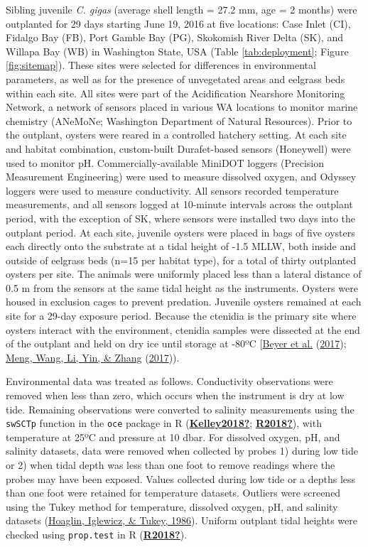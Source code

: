\documentclass [11pt, proquest] {uwthesis}[2015/03/03]
\begin{document}
Sibling juvenile \emph{C. gigas} (average shell length = 27.2 mm, age = 2 months) were outplanted for 29 days starting June 19, 2016 at five locations: Case Inlet (CI), Fidalgo Bay (FB), Port Gamble Bay (PG), Skokomish River Delta (SK), and Willapa Bay (WB) in Washington State, USA (Table \ref{tab:deployment}; Figure \ref{fig:sitemap}). These sites were selected for differences in environmental parameters, as well as for the presence of unvegetated areas and eelgrass beds within each site. All sites were part of the Acidification Nearshore Monitoring Network, a network of sensors placed in various WA locations to monitor marine chemistry (ANeMoNe; Washington Department of Natural Resources). Prior to the outplant, oysters were reared in a controlled hatchery setting. At each site and habitat combination, custom-built Durafet-based sensors (Honeywell) were used to monitor pH. Commercially-available MiniDOT loggers (Precision Measurement Engineering) were used to measure dissolved oxygen, and Odyssey loggers were used to measure conductivity. All sensors recorded temperature measurements, and all sensors logged at 10-minute intervals across the outplant period, with the exception of SK, where sensors were installed two days into the outplant period. At each site, juvenile oysters were placed in bags of five oysters each directly onto the substrate at a tidal height of -1.5 MLLW, both inside and outside of eelgrass beds (n=15 per habitat type), for a total of thirty outplanted oysters per site. The animals were uniformly placed less than a lateral distance of 0.5 m from the sensors at the same tidal height as the instruments. Oysters were housed in exclusion cages to prevent predation. Juvenile oysters remained at each site for a 29-day exposure period. Because the ctenidia is the primary site where oysters interact with the environment, ctenidia samples were dissected at the end of the outplant and held on dry ice until storage at -80ºC {[}\protect\hyperlink{ref-Beyer2017}{Beyer et al.} (\protect\hyperlink{ref-Beyer2017}{2017}); \protect\hyperlink{ref-Meng2017}{Meng, Wang, Li, Yin, \& Zhang} (\protect\hyperlink{ref-Meng2017}{2017})).

Environmental data was treated as follows. Conductivity observations were removed when less than zero, which occurs when the instrument is dry at low tide. Remaining observations were converted to salinity measurements using the \texttt{swSCTp} function in the \texttt{oce} package in R (\protect\hyperlink{ref-Kelley2018}{\textbf{Kelley2018?}}; \protect\hyperlink{ref-R2018}{\textbf{R2018?}}), with temperature at 25ºC and pressure at 10 dbar. For dissolved oxygen, pH, and salinity datasets, data were removed when collected by probes 1) during low tide or 2) when tidal depth was less than one foot to remove readings where the probes may have been exposed. Values collected during low tide or a depths less than one foot were retained for temperature datasets. Outliers were screened using the Tukey method for temperature, dissolved oxygen, pH, and salinity datasets (\protect\hyperlink{ref-Hoaglin1986}{Hoaglin, Iglewicz, \& Tukey, 1986}). Uniform outplant tidal heights were checked using \texttt{prop.test} in R (\protect\hyperlink{ref-R2018}{\textbf{R2018?}}).
\end{document}
